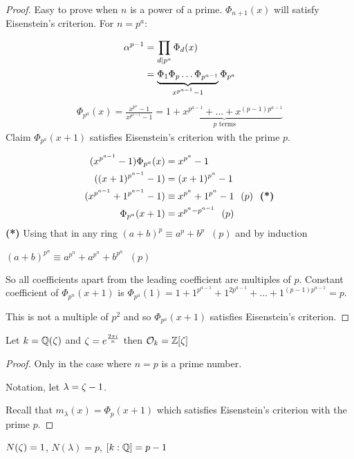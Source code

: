 \documentclass[11pt]{article}
\begin{document}
\begin{proof}
	Easy to prove when $n$ is a power of a prime. 
	$\Phi_{n+1} (x)$ will satisfy Eisenstein's criterion.
	For $n=p^a$:

	\begin{align*}
		\alpha^{p-1} &= \prod_{d|p^a} \Phi_d(x)\\
		&= \underbrace{\Phi_1 \Phi_p \dots \Phi_{p^{a-1}}}_{x^{p^{a-1}}-1} \Phi_{p^a}
	\end{align*}
	\begin{align*}
		\Phi_{p^a}(x) = \frac{x^{p^a}-1}{x^{p^{a-1}}-1} = \underbrace{1 + x^{p^{a-1}} + \dots + x^{(p-1)p^{a-1}}}_{p \text{ terms}}
	\end{align*}
	Claim $\Phi_{p^a}(x+1)$ satisfies Eisenstein's criterion with the prime $p$.

	\begin{align*}
		(x^{p^{a-1}}-1) \Phi_{p^a}(x) &= x^{p^a}-1\\
		((x+1)^{p^{a-1}}-1)&=(x+1)^{p^a} -1\\
		(x^{p^{a-1} }+ 1^{p^{a-1}}-1)&\equiv x^{p^a} + 1^{p^a} -1 \hspace{7pt} (p) \textbf{\hspace{7pt}(*)}\\
		\Phi_{p^a}(x+1) &= x^{p^a - p^{a-1}}\hspace{7pt} (p)
	\end{align*}
	\textbf{(*)} Using that in any ring $(a+b)^p \equiv a^p + b^p \hspace{7pt} (p) $ and by induction 
	\spa

	$(a+b)^{p^n} \equiv a^{p^n} + a^{p^n} + b^{p^n} \hspace{7pt} (p)$

	So all coefficients apart from the leading coefficient are multiples of $p$. Constant coefficient of $\Phi_{p^n}(x+1)$ is $\Phi_{p^a}(1) = 1 + 1^{p^{a-1}} + 1^{2p^{a-1}} + \dots + 1^{(p-1)p^{a-1}} = p$.
\spa

	This is not a multiple of $p^2$ and so $\Phi_{p^a}(x+1)$ satisfies Eisenstein's criterion.

\end{proof}



\begin{theorem}
	Let $k =\mathbb{Q}(\zeta) $ and $\zeta=e^{\frac{2 \pi i}{n}}$ then $\mathcal{O}_k = \mathbb{Z}[\zeta ]$
\end{theorem}

\begin{proof}
Only in the case where $n=p$ is a prime number.

Notation, let $\lambda = \zeta - 1$.

	Recall that $m_\lambda(x) = \Phi_p(x+1)$ which satisfies Eisenstein's criterion with the prime $p$.

\end{proof}
\begin{lemma}
	$N(\zeta) = 1$, $ N(\lambda) = p$, $ [k:\mathbb{Q}] = p-1$
\end{lemma}
\end{document}
